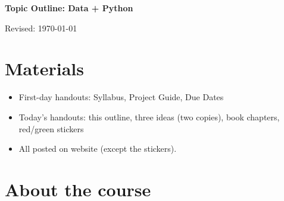 


\pagestyle{headandfoot}
\runningheadrule
\firstpageheadrule
{}
\runningheader{}{}{}
\runningfooter{}{}{}


\bigskip
\centerline{\Large \bf Topic Outline:  Data + Python}
\medskip
\centerline{Revised: \today}


\section*{Materials}

\begin{itemize}
\item  First-day handouts:  Syllabus, Project Guide, Due Dates
\item  Today's handouts:  this outline, three ideas (two copies), book chapters, red/green stickers
\item  All posted on website (except the stickers).
\end{itemize}

\section*{About the course}

